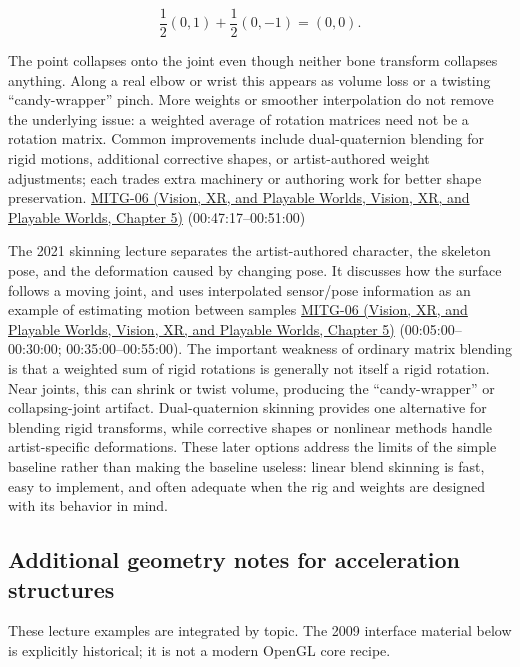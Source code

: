\[
\frac12(0,1)+\frac12(0,-1)=(0,0).
\]

The point collapses onto the joint even though neither bone transform collapses anything. Along a real elbow or wrist this appears as volume loss or a twisting ``candy-wrapper'' pinch. More weights or smoother interpolation do not remove the underlying issue: a weighted average of rotation matrices need not be a rotation matrix. Common improvements include dual-quaternion blending for rigid motions, additional corrective shapes, or artist-authored weight adjustments; each trades extra machinery or authoring work for better shape preservation. \href{../07-Vision-XR-and-Playable-Worlds/main.pdf\#nameddest=04-visual-computing-ii-ch036-mitg-06---animation-skinningenveloping}{MITG-06 (Vision, XR, and Playable Worlds, Vision, XR, and Playable Worlds, Chapter 5)} (00:47:17--00:51:00)

The 2021 skinning lecture separates the artist-authored character, the skeleton pose, and the deformation caused by changing pose. It discusses how the surface follows a moving joint, and uses interpolated sensor/pose information as an example of estimating motion between samples \href{../07-Vision-XR-and-Playable-Worlds/main.pdf\#nameddest=04-visual-computing-ii-ch036-mitg-06---animation-skinningenveloping}{MITG-06 (Vision, XR, and Playable Worlds, Vision, XR, and Playable Worlds, Chapter 5)} (00:05:00--00:30:00; 00:35:00--00:55:00). The important weakness of ordinary matrix blending is that a weighted sum of rigid rotations is generally not itself a rigid rotation. Near joints, this can shrink or twist volume, producing the ``candy-wrapper'' or collapsing-joint artifact. Dual-quaternion skinning provides one alternative for blending rigid transforms, while corrective shapes or nonlinear methods handle artist-specific deformations. These later options address the limits of the simple baseline rather than making the baseline useless: linear blend skinning is fast, easy to implement, and often adequate when the rig and weights are designed with its behavior in mind.

\subsection{Additional geometry notes for acceleration structures}\label{04-visual-computing-ii-ch029-additional-geometry-notes-for-acceleration-structures}

These lecture examples are integrated by topic. The 2009 interface material below is explicitly historical; it is not a modern OpenGL core recipe.


